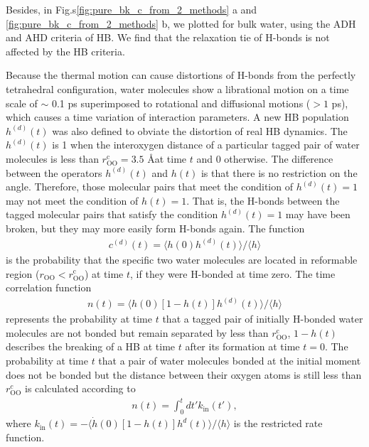 Besides, in Fig.s\thinspace\ref{fig:pure_bk_c_from_2_methods} a and \ref{fig:pure_bk_c_from_2_methods} b, 
we plotted \CHB for bulk water, using the ADH and AHD criteria of HB. We find that the relaxation tie of H-bonds is not affected by the HB criteria. 
%

Because the thermal motion can cause distortions of H-bonds from the perfectly tetrahedral configuration,
water molecules show a librational motion on a time scale of $\sim$ 0.1 ps superimposed to rotational and diffusional motions ($> 1$ ps), 
which causes a time variation of interaction parameters.
A new HB population $h^{(d)}(t)$ was also defined to obviate the distortion of real HB dynamics\cite{Sciortino1989,Chandra2000}.
The $h^{(d)}(t)$ is 1 when the interoxygen distance of a particular tagged pair of water molecules is less than $r^{\text{c}}_{\text{OO}}=3.5$ \AA at time $t$ and 0 otherwise. 
The difference between the operators $h^{(d)}(t)$ and $h(t)$ is that there is no restriction on the angle. Therefore, those molecular pairs that meet the condition of $h^{(d)}(t)=1$ may not meet the condition of $h(t)=1$.
That is, the H-bonds between the tagged molecular pairs that satisfy the condition $h^{(d)}(t)=1$ may have been broken, but they may more easily form H-bonds again.
The function 
\begin{eqnarray}
  c^{(d)}(t)=\langle h(0)h^{(d)}(t) \rangle/\langle h\rangle
\label{eq:C_HB_d}
\end{eqnarray}
is the probability that the specific two water molecules are located in reformable region ($r_{\text{OO}} < r^{\text{c}}_{\text{OO}}$) at time $t$,
if they were H-bonded at time zero. 
The time correlation function 
%
\begin{eqnarray}
n(t)=\langle h(0)[1-h(t)]h^{(d)}(t) \rangle/\langle h\rangle 
\label{eq:n_HB}
\end{eqnarray}
represents the probability at time $t$ 
that a tagged pair of initially H-bonded water molecules are not bonded but remain separated by less than $r_{\text{OO}}^{\text{c}}$,
$1-h(t)$ describes the breaking of a HB at time $t$ after its formation at time $t=0$.
The probability at time $t$ that a pair of water molecules bonded at the initial moment does not be bonded 
but the distance between their oxygen atoms is still less than $r_\text{OO}^c$ is calculated according to 
\begin{eqnarray}
n(t) = \int_0^t dt'k_\text{in}(t'),
\label{eq:n_from_k_in}
\end{eqnarray}
where $k_\text{in}(t) = -\langle \dot h(0)[1-h(t)]h^d(t) \rangle/\langle h\rangle$ is the restricted rate function. 
\FloatBarrier
